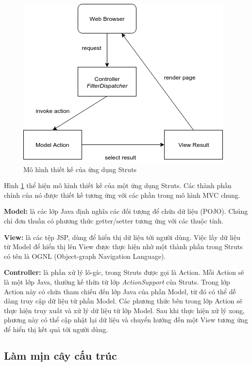 \documentclass[12pt]{report}
\begin{document}
\begin{figure}[h]
	\centering
	\includegraphics[scale=0.8]{struts-architecture}
	\caption{Mô hình thiết kế của ứng dụng Struts}
	\label{fig:struts-architecture}
\end{figure}

Hình \ref{fig:struts-architecture} thể hiện mô hình thiết kế của một ứng dụng Struts. Các thành phần chính của nó được thiết kế tương ứng với các phần trong mô hình MVC chung.

\textbf{Model:} là các lớp Java định nghĩa các đối tượng để chứa dữ liệu (POJO). Chúng chỉ đơn thuần có phương thức getter/setter tương ứng với các thuộc tính.

\textbf{View:} là các tệp JSP, dùng để hiển thị dữ liệu tới người dùng. Việc lấy dữ liệu từ Model để hiển thị lên View được thực hiện nhờ một thành phần trong Struts có tên là OGNL (Object-graph Navigation Language).

\textbf{Controller:} là phần xử lý lô-gíc, trong Struts được gọi là Action. Mỗi Action sẽ là một lớp Java, thường kế thừa từ lớp \textit{ActionSupport} của Struts. Trong lớp Action này có chứa tham chiếu đến lớp Java của phần Model, từ đó có thể dễ dàng truy cập dữ liệu từ phần Model. Các phương thức bên trong lớp Action sẽ thực hiện truy xuất và xử lý dữ liệu từ lớp Model. Sau khi thực hiện xử lý xong, phương này có thể cập nhật lại dữ liệu và chuyển hướng đến một View tương ứng để hiển thị kết quả tới người dùng.

\subsection{Làm mịn cây cấu trúc}
\end{document}
